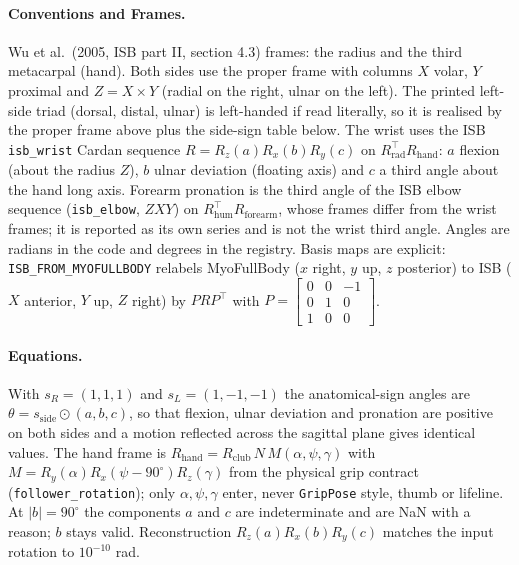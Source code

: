 \documentclass[11pt,a4paper]{article}
\begin{document}
\paragraph{Conventions and Frames.}
Wu et al.\ (2005, ISB part II, section 4.3) frames: the radius and the third
metacarpal (hand). Both sides use the proper frame with columns
$X$ volar, $Y$ proximal and $Z=X\times Y$ (radial on the right, ulnar on the
left). The printed left-side triad (dorsal, distal, ulnar) is left-handed if
read literally, so it is realised by the proper frame above plus the
side-sign table below. The wrist uses the ISB \texttt{isb\_wrist} Cardan
sequence $R=R_z(a)R_x(b)R_y(c)$ on $R_{\mathrm{rad}}^{\top}R_{\mathrm{hand}}$:
$a$ flexion (about the radius $Z$), $b$ ulnar deviation (floating axis) and $c$
a third angle about the hand long axis. Forearm pronation is the third angle of
the ISB elbow sequence (\texttt{isb\_elbow}, $ZXY$) on
$R_{\mathrm{hum}}^{\top}R_{\mathrm{forearm}}$, whose frames differ from the
wrist frames; it is reported as its own series and is not the wrist third
angle. Angles are radians in the code and degrees in the registry.
Basis maps are explicit: \texttt{ISB\_FROM\_MYOFULLBODY} relabels MyoFullBody
($x$ right, $y$ up, $z$ posterior) to ISB ($X$ anterior, $Y$ up, $Z$ right) by
$P R P^{\top}$ with $P=\left[\begin{smallmatrix}0&0&-1\\0&1&0\\1&0&0\end{smallmatrix}\right]$.

\paragraph{Equations.}
With $s_R=(1,1,1)$ and $s_L=(1,-1,-1)$ the anatomical-sign angles are
$\theta=s_{\mathrm{side}}\odot(a,b,c)$, so that flexion, ulnar deviation and
pronation are positive on both sides and a motion reflected across the
sagittal plane gives identical values. The hand frame is
$R_{\mathrm{hand}}=R_{\mathrm{club}}\,N\,M(\alpha,\psi,\gamma)$ with
$M=R_y(\alpha)R_x(\psi-90^\circ)R_z(\gamma)$ from the physical grip contract
(\texttt{follower\_rotation}); only $\alpha,\psi,\gamma$ enter, never
\texttt{GripPose} style, thumb or lifeline. At $|b|=90^\circ$ the components
$a$ and $c$ are indeterminate and are NaN with a reason; $b$ stays valid.
Reconstruction $R_z(a)R_x(b)R_y(c)$ matches the input rotation to
$10^{-10}$ rad.
\end{document}
